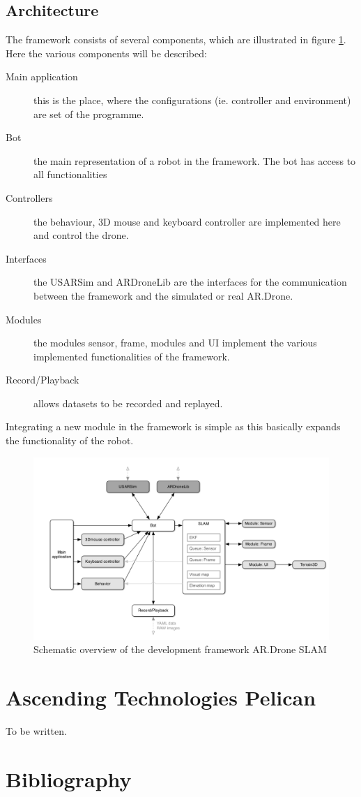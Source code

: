 \documentclass[a4paper]{article}
\begin{document}
\begin{appendices}
\subsection{Architecture}
The framework consists of several components, which are illustrated in figure \ref{frameworknick}. Here the various components will be described:
\begin{description}
\item[Main application] this is the place, where the configurations (ie. controller and environment) are set of the programme.
\item[Bot] the main representation of a robot in the framework. The bot has access to all functionalities
\item[Controllers] the behaviour, 3D mouse and keyboard controller are implemented here and control the drone.
\item[Interfaces] the USARSim and ARDroneLib are the interfaces for the communication between the framework and the simulated or real AR.Drone.
\item[Modules] the modules sensor, frame, modules and UI implement the various implemented functionalities of the framework.
\item[Record/Playback] allows datasets to be recorded and replayed.
\end{description}
Integrating a new module in the framework is simple as this basically expands the functionality of the robot.
\begin{figure}[!ht]
\centering
\includegraphics[width=\textwidth]{images/framework.png}
\caption{Schematic overview \cite{Dijkshoorn2012} of the development framework AR.Drone SLAM}
\label{frameworknick}
\end{figure}
\newpage
\section{Ascending Technologies Pelican}
\label{PELICAN}
To be written.
\end{appendices}

\newpage

\section{Bibliography}
\renewcommand{\section}[2]{}


\end{document}
